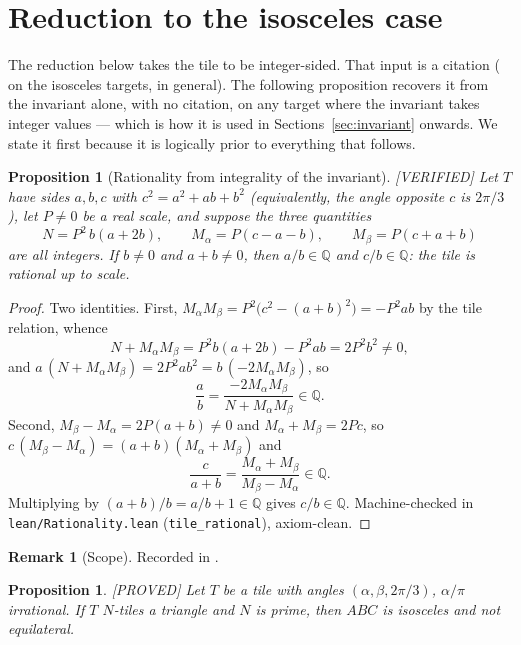 \documentclass[11pt,reqno]{amsart}
\theoremstyle{plain}
\newtheorem{proposition}[theorem]{Proposition}
\theoremstyle{definition}
\newtheorem{remark}[theorem]{Remark}
\newcommand{\Q}{\mathbb{Q}}
\newcommand{\lab}[1]{\hfill\textnormal{\footnotesize\textsc{[#1]}}}
\begin{document}
\section{Reduction to the isosceles case}\label{sec:reduction}

The reduction below takes the tile to be integer-sided. That input is a citation
(\cite[Thm.~12.5]{BeesonIso} on the isosceles targets, \cite{BeesonZhang} in general). The following
proposition recovers it from the invariant alone, with no citation, on any target where the invariant
takes integer values --- which is how it is used in Sections~\ref{sec:invariant} onwards. We state it
first because it is logically prior to everything that follows.

\begin{proposition}[Rationality from integrality of the invariant]\label{prop:rationality}\lab{VERIFIED}
Let $T$ have sides $a,b,c$ with $c^2=a^2+ab+b^2$ (equivalently, the angle opposite $c$ is $2\pi/3$),
let $P\ne0$ be a real scale, and suppose the three quantities
\[
N=P^2\,b(a+2b),\qquad M_\alpha=P(c-a-b),\qquad M_\beta=P(c+a+b)
\]
are all integers. If $b\ne0$ and $a+b\ne0$, then $a/b\in\Q$ and $c/b\in\Q$: the tile is rational up
to scale.
\end{proposition}

\begin{proof}
Two identities. First, $M_\alpha M_\beta=P^2\bigl(c^2-(a+b)^2\bigr)=-P^2ab$ by the tile relation,
whence
\[
N+M_\alpha M_\beta=P^2b(a+2b)-P^2ab=2P^2b^2\ne0 ,
\]
and $a\,(N+M_\alpha M_\beta)=2P^2ab^2=b\,(-2M_\alpha M_\beta)$, so
\[
\frac ab=\frac{-2M_\alpha M_\beta}{N+M_\alpha M_\beta}\in\Q .
\]
Second, $M_\beta-M_\alpha=2P(a+b)\ne0$ and $M_\alpha+M_\beta=2Pc$, so
$c\,(M_\beta-M_\alpha)=(a+b)(M_\alpha+M_\beta)$ and
\[
\frac{c}{a+b}=\frac{M_\alpha+M_\beta}{M_\beta-M_\alpha}\in\Q .
\]
Multiplying by $(a+b)/b=a/b+1\in\Q$ gives $c/b\in\Q$. Machine-checked in
\texttt{lean/Rationality.lean} (\texttt{tile\_rational}), axiom-clean.
\end{proof}

\begin{remark}[Scope]\label{rem:rationality}
Recorded in \cite{Obstructions}.
\end{remark}

\begin{proposition}\label{prop:reduction}\lab{PROVED}
Let $T$ be a tile with angles $(\alpha,\beta,2\pi/3)$, $\alpha/\pi$ irrational. If $T$ $N$-tiles a
triangle and $N$ is prime, then $ABC$ is isosceles and not equilateral.
\end{proposition}
\end{document}
